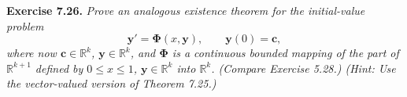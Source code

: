 \documentclass{article}
\begin{document}



\textbf{Exercise 7.26.}
\emph{Prove an analogous existence theorem for the initial-value problem
\[
  \mathbf{y}' = \bm{\Phi}(x, \mathbf{y}), \qquad \mathbf{y}(0) = \mathbf{c},
\]
where now $\mathbf{c} \in \mathbb{R}^k$, $\mathbf{y} \in \mathbb{R}^k$,
and $\bm{\Phi}$ is a continuous bounded mapping of the part of $\mathbb{R}^{k+1}$
defined by $0 \leq x \leq 1$, $\mathbf{y} \in \mathbb{R}^k$ into $\mathbb{R}^k$.
(Compare Exercise 5.28.)
(Hint: Use the vector-valued version of Theorem 7.25.)} \\



\end{document}
